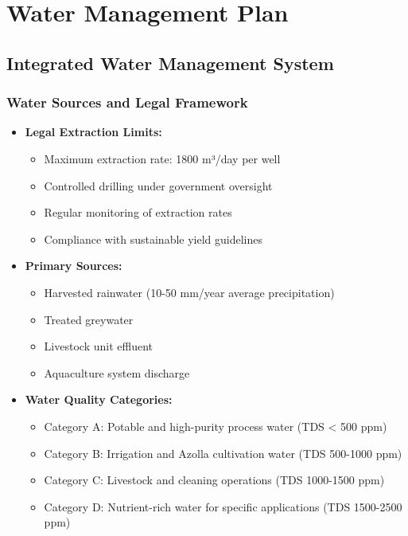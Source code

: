 \section{Water Management Plan}

\subsection{Integrated Water Management System}

\subsubsection{Water Sources and Legal Framework}
\begin{itemize}
    \item \textbf{Legal Extraction Limits:}
    \begin{itemize}
        \item Maximum extraction rate: 1800 m³/day per well
        \item Controlled drilling under government oversight
        \item Regular monitoring of extraction rates
        \item Compliance with sustainable yield guidelines
    \end{itemize}
    
    \item \textbf{Primary Sources:}
    \begin{itemize}
        \item Harvested rainwater (10-50 mm/year average precipitation)
        \item Treated greywater
        \item Livestock unit effluent
        \item Aquaculture system discharge
    \end{itemize}
    
    \item \textbf{Water Quality Categories:}
    \begin{itemize}
        \item Category A: Potable and high-purity process water (TDS < 500 ppm)
        \item Category B: Irrigation and Azolla cultivation water (TDS 500-1000 ppm)
        \item Category C: Livestock and cleaning operations (TDS 1000-1500 ppm)
        \item Category D: Nutrient-rich water for specific applications (TDS 1500-2500 ppm)
    \end{itemize}
\end{itemize}

